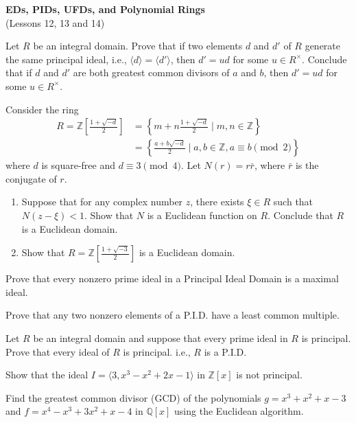\documentclass[
    11pt,a4paper,
]{exam}
\begin{document}
\def\contador{Problem Set 6}


\begin{center}
    {\bfseries\Large
        EDs, PIDs, UFDs, and Polynomial  Rings}\\
    (Lessons 12, 13 and  14)
\end{center}

\begin{questions}

\question
Let $R$ be an integral domain. Prove that if two elements $d$ and $d'$ of $R$ generate the same principal ideal, i.e., $\langle d \rangle = \langle d' \rangle$, then $d' = ud$ for some $u \in R^\times$. Conclude that if $d$ and $d'$ are both greatest common divisors of $a$ and $b$, then $d' = ud$ for some $u \in R^\times$.

\question
Consider the ring
\begin{align*}
R = \mathbb{Z}\left[\frac{1 + \sqrt{-d}}{2}\right] &= \left\{m + n\frac{1 + \sqrt{-d}}{2} \mid m, n \in \mathbb{Z} \right\}\\
&= \left\{\frac{a + b\sqrt{-d}}{2} \mid a, b \in \mathbb{Z}, a \equiv b \pmod{2} \right\}
\end{align*} 
where $d$ is square-free and $d \equiv 3 \pmod{4}$. Let $N(r) = r\bar{r}$, where $\bar{r}$ is the conjugate of $r$.
\begin{enumerate}[label=(\roman*)]
    \item Suppose that for any complex number $z$, there exists $\xi \in R$ such that $N(z - \xi) < 1$. Show that $N$ is a Euclidean function on $R$. Conclude that $R$ is a Euclidean domain.
    \item Show that $R = \mathbb{Z}\left[\frac{1 + \sqrt{-3}}{2}\right]$ is a Euclidean domain.
\end{enumerate}

\question Prove that every nonzero prime ideal in a Principal Ideal Domain
is a maximal ideal.

\question Prove that any two nonzero elements of a P.I.D. have a least common
multiple.

\question Let \(R\) be an integral domain and suppose that every prime ideal in \(R\)
is principal. Prove that every ideal of \(R\) is principal. i.e., \(R\) is a P.I.D.

\question
Show that the ideal $I = \langle 3, x^3 - x^2 + 2x - 1 \rangle$ in $\mathbb{Z}[x]$ is not principal.

\question
Find the greatest common divisor (GCD) of the polynomials $g = x^3 + x^2 + x - 3$ and $f = x^4 - x^3 + 3x^2 + x - 4$ in $\mathbb{Q}[x]$ using the Euclidean algorithm.


\end{questions}
\end{document}
